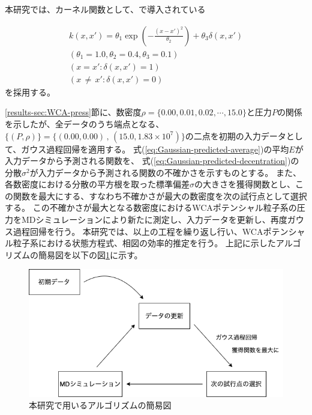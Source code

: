 \documentclass[titlepage]{jsreport}
\begin{document}
{{{本研究では、カーネル関数として、\cite{Gauss-machine-learning}で導入されている

\large
\begin{eqnarray}
    k(x,x')=\theta_1\exp\left(-\frac{(x-x')^2}{\theta_2}\right)+\theta_3\delta(x,x')\\ \label{eq:Gauss-kernel}
    (\theta_1=1.0,\theta_2=0.4,\theta_3=0.1) \nonumber \\ 
    (x=x':\delta(x,x')=1) \nonumber \\
    (x\,{\neq}\,x':\delta(x,x')=0) \nonumber
\end{eqnarray}
\normalsize
を採用する。

\ref{results-sec:WCA-press}節に、数密度$\rho=\{0.00,0.01,0.02,\cdots,15.0\}$と圧力$P$の関係を示したが、全データのうち端点となる、
$\{(P,\rho)\}=\{(0.00,0.00)\,,\,(15.0,1.83×10^7)\}$の二点を初期の入力データとして、ガウス過程回帰を適用する。
式(\ref{eq:Gaussian-predicted-average})の平均$E$が入力データから予測される関数を、
式(\ref{eq:Gaussian-predicted-decentration})の分散$\sigma^2$が入力データから予測される関数の不確かさを示すものとする。
また、各数密度における分散の平方根を取った標準偏差$\sigma$の大きさを獲得関数とし、この関数を最大にする、すなわち不確かさが最大の数密度を次の試行点として選択する。
この不確かさが最大となる数密度におけるWCAポテンシャル粒子系の圧力をMDシミュレーションにより新たに測定し、入力データを更新し、再度ガウス過程回帰を行う。
本研究では、以上の工程を繰り返し行い、WCAポテンシャル粒子系における状態方程式、相図の効率的推定を行う。
上記に示したアルゴリズムの簡易図を以下の図\ref{fig:algorithm}に示す。

\begin{figure}[htbp]
    \begin{center}
        \includegraphics[width=14cm]{fig/algorithm.png}
    \end{center}
    \caption{本研究で用いるアルゴリズムの簡易図}
    \label{fig:algorithm}
\end{figure}

}}}
\end{document}
